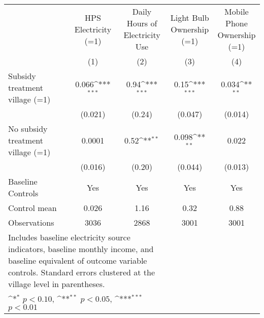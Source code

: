 \def\sym#1{\ifmmode^{#1}\else\(^{#1}\)\fi}
\begin{adjustbox}{max
width={.97\textwidth},caption={Endline 1 electricity and asset outcomes},nofloat=table}
\begin{tabular}{l*{4}{c}}
\toprule
& \shortstack{HPS\\Electricity (=1)} & \shortstack{Daily Hours of\\Electricity Use} & \shortstack{Light Bulb\\Ownership (=1)} & \shortstack{Mobile Phone\\Ownership (=1)} \\
& (1) & (2) & (3) &(4) \\ \hline
Subsidy treatment village (=1)&   0.066\sym{***} &  0.94\sym{***}&     0.15\sym{***} &    0.034\sym{**} \\
               & (0.021) &   (0.24)         &  (0.047)   &  (0.014)       \\
No subsidy treatment village (=1)& 0.0001 &    0.52\sym{**} &    0.098\sym{**} &    0.022 \\
              & (0.016)  &   (0.20)         &  (0.044)   &  (0.013)      \\
                \addlinespace
Baseline Controls &    Yes &  Yes         &      Yes     & Yes    \\

Control mean     & 0.026      &     1.16         &     0.32   &     0.88      \\
Observations    & 3036&     2868         &     3001    &     3001     \\
\bottomrule
\multicolumn{3}{p{\textwidth}}{\footnotesize Includes baseline electricity source indicators, baseline monthly income, and baseline equivalent of outcome variable controls. Standard errors clustered at the village level in parentheses.}\\
\multicolumn{3}{p{\textwidth}}{\footnotesize \sym{*} \(p<0.10\), \sym{**} \(p<0.05\), \sym{***} \(p<0.01\)}\\
\end{tabular}\end{adjustbox}

